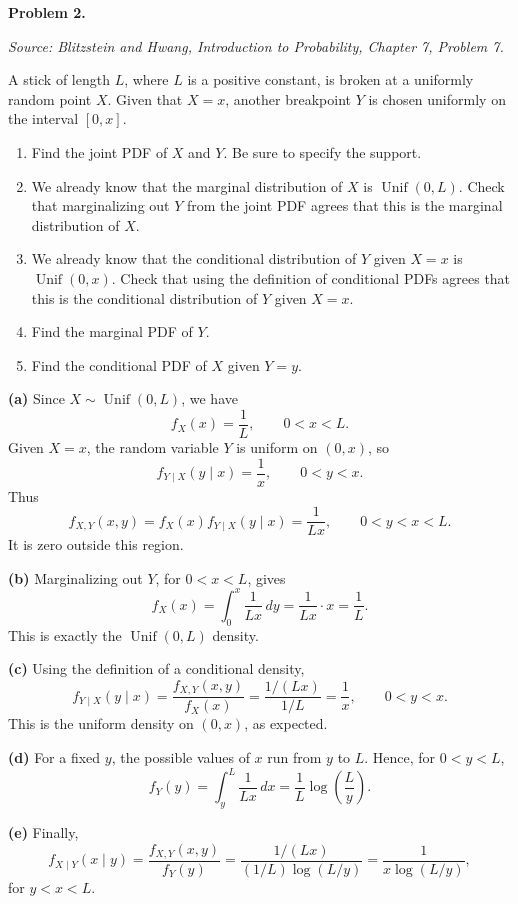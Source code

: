 \documentclass[11pt]{article}
\newcommand{\source}[2]{%
    \vspace{0.15cm}
    {\small\textit{Source: Blitzstein and Hwang, \textit{Introduction to Probability}, Chapter #1, Problem #2.}}
}
\begin{document}

\begin{problemheader}
\textbf{Problem 2.  }
\end{problemheader}
\source{7}{7}

A stick of length $L$, where $L$ is a positive constant, is broken at a uniformly random point $X$. Given that $X=x$, another breakpoint $Y$ is chosen uniformly on the interval $[0,x]$.

\begin{enumerate}[label=(\alph*), leftmargin=*]
    \item Find the joint PDF of $X$ and $Y$. Be sure to specify the support.

    \item We already know that the marginal distribution of $X$ is $\operatorname{Unif}(0,L)$. Check that marginalizing out $Y$ from the joint PDF agrees that this is the marginal distribution of $X$.

    \item We already know that the conditional distribution of $Y$ given $X=x$ is $\operatorname{Unif}(0,x)$. Check that using the definition of conditional PDFs agrees that this is the conditional distribution of $Y$ given $X=x$.

    \item Find the marginal PDF of $Y$.

    \item Find the conditional PDF of $X$ given $Y=y$.
\end{enumerate}

\begin{solutionbox}
\textbf{(a)} Since \(X\sim \operatorname{Unif}(0,L)\), we have
\[
f_X(x)=\frac1L,\qquad 0<x<L.
\]
Given \(X=x\), the random variable \(Y\) is uniform on \((0,x)\), so
\[
f_{Y\mid X}(y\mid x)=\frac1x,\qquad 0<y<x.
\]
Thus
\[
f_{X,Y}(x,y)=f_X(x)f_{Y\mid X}(y\mid x)=\frac{1}{Lx},
\qquad 0<y<x<L.
\]
It is zero outside this region.
 

\textbf{(b)} Marginalizing out \(Y\), for \(0<x<L\), gives
\[
f_X(x)=\int_0^x \frac{1}{Lx}\,dy=\frac{1}{Lx}\cdot x=\frac1L.
\]
This is exactly the \(\operatorname{Unif}(0,L)\) density.


\textbf{(c)} Using the definition of a conditional density,
\[
f_{Y\mid X}(y\mid x)=\frac{f_{X,Y}(x,y)}{f_X(x)}
=\frac{1/(Lx)}{1/L}=\frac1x,
\qquad 0<y<x.
\]
This is the uniform density on \((0,x)\), as expected.
 

\textbf{(d)} For a fixed \(y\), the possible values of \(x\) run from \(y\) to \(L\). Hence, for \(0<y<L\),
\[
f_Y(y)=\int_y^L \frac{1}{Lx}\,dx
=\frac1L\log\left(\frac{L}{y}\right).
\]
 

\textbf{(e)} Finally,
\[
f_{X\mid Y}(x\mid y)
=\frac{f_{X,Y}(x,y)}{f_Y(y)}
=\frac{1/(Lx)}{(1/L)\log(L/y)}
=\frac{1}{x\log(L/y)},
\]
for \(y<x<L\).

 
\end{solutionbox}
\newpage
\end{document}
